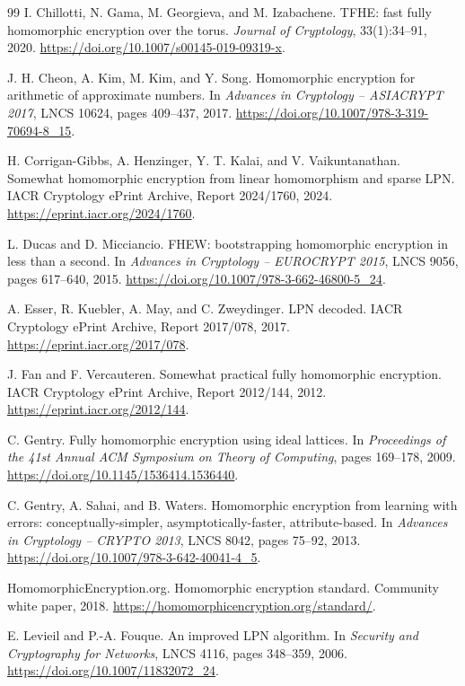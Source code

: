 \begin{thebibliography}{99}
I. Chillotti, N. Gama, M. Georgieva, and M. Izabachene.
TFHE: fast fully homomorphic encryption over the torus.
\emph{Journal of Cryptology}, 33(1):34--91, 2020.
\url{https://doi.org/10.1007/s00145-019-09319-x}.

J. H. Cheon, A. Kim, M. Kim, and Y. Song.
Homomorphic encryption for arithmetic of approximate numbers.
In \emph{Advances in Cryptology -- ASIACRYPT 2017}, LNCS 10624, pages 409--437, 2017.
\url{https://doi.org/10.1007/978-3-319-70694-8_15}.

H. Corrigan-Gibbs, A. Henzinger, Y. T. Kalai, and V. Vaikuntanathan.
Somewhat homomorphic encryption from linear homomorphism and sparse LPN.
IACR Cryptology ePrint Archive, Report 2024/1760, 2024.
\url{https://eprint.iacr.org/2024/1760}.

L. Ducas and D. Micciancio.
FHEW: bootstrapping homomorphic encryption in less than a second.
In \emph{Advances in Cryptology -- EUROCRYPT 2015}, LNCS 9056, pages 617--640, 2015.
\url{https://doi.org/10.1007/978-3-662-46800-5_24}.

A. Esser, R. Kuebler, A. May, and C. Zweydinger.
LPN decoded.
IACR Cryptology ePrint Archive, Report 2017/078, 2017.
\url{https://eprint.iacr.org/2017/078}.

J. Fan and F. Vercauteren.
Somewhat practical fully homomorphic encryption.
IACR Cryptology ePrint Archive, Report 2012/144, 2012.
\url{https://eprint.iacr.org/2012/144}.

C. Gentry.
Fully homomorphic encryption using ideal lattices.
In \emph{Proceedings of the 41st Annual ACM Symposium on Theory of Computing}, pages 169--178, 2009.
\url{https://doi.org/10.1145/1536414.1536440}.

C. Gentry, A. Sahai, and B. Waters.
Homomorphic encryption from learning with errors: conceptually-simpler, asymptotically-faster, attribute-based.
In \emph{Advances in Cryptology -- CRYPTO 2013}, LNCS 8042, pages 75--92, 2013.
\url{https://doi.org/10.1007/978-3-642-40041-4_5}.

HomomorphicEncryption.org.
Homomorphic encryption standard.
Community white paper, 2018.
\url{https://homomorphicencryption.org/standard/}.

E. Levieil and P.-A. Fouque.
An improved LPN algorithm.
In \emph{Security and Cryptography for Networks}, LNCS 4116, pages 348--359, 2006.
\url{https://doi.org/10.1007/11832072_24}.



\end{thebibliography}
